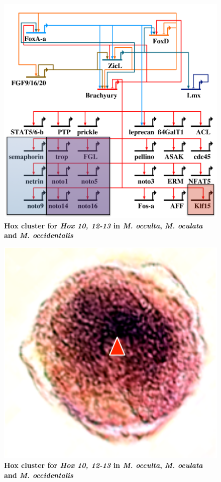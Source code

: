 \begin{figure}[tbp]
\centering
\includegraphics[scale=0.55]{figures/bra_grn.pdf}
\caption{\textbf{Hox cluster for \textit{Hox 10, 12-13} in \textit{M. occulta}, \textit{M. oculata} and \textit{M. occidentalis}} }
\label{fig:hox12}
\end{figure}

\begin{figure}[tbp]
\centering
\includegraphics[scale=0.55]{figures/prickle.pdf}
\caption{\textbf{Hox cluster for \textit{Hox 10, 12-13} in \textit{M. occulta}, \textit{M. oculata} and \textit{M. occidentalis}} }
\label{fig:hox12}
\end{figure}



